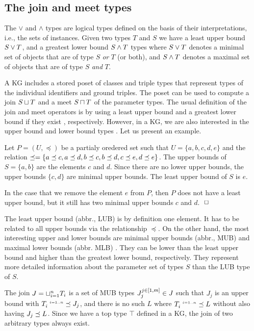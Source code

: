 \documentclass[runningheads]{llncs}
\newcommand{\s}{\scriptscriptstyle\ \,}
\newcommand{\finbox}{\phantom{.}\hfill\Box}
\begin{document}
\subsection{The join and meet types\label{sec:join-meet-types}}

The $\lor$ and $\land$ types are logical types defined on the basis of
their interpretations, i.e., the sets of instances. Given two types
$T$ and $S$ we have a least upper bound $S\lor\/T$, and a greatest
lower bound $S\land\/T$ types where $S\lor\/T$ denotes a minimal set
of objects that are of type $S$ \emph{or} $T$ (or both), and
$S\land\/T$ denotes a maximal set of objects that are of type $S$
\emph{and} $T$.

A KG includes a stored poset of classes and triple types that
represent types of the individual identifiers and ground triples. The
poset can be used to compute a join $S\sqcup\/T$ and a meet
$S\sqcap\/T$ of the parameter types. The usual definition of the join
and meet operators is by using a least upper bound and a greatest
lower bound if they exist \cite{Pierce2002}, respectively. However, in
a KG, we are also interested in the upper bound and lower bound types
\cite{DaveyPriestley2002}. Let us present an example.

\begin{example}
  Let $P=(U,\preceq)$ be a partialy oredered set such that
  $U=\{a,b,c,d,e\}$ and the relation
  $\preceq=\{a\preceq\/c,a\preceq\/d,b\preceq\/c,b\preceq\/d,c\preceq\/e,d\preceq\/e\}$.
  The upper bounds of $S=\{a,b\}$ are the elements $c$ and $d$. Since
  there are no lower upper bounds, the upper bounds $\{c,d\}$ are
  minimal upper bounds. The least upper bound of $S$ is $e$.

  In the case that we remove the element $e$ from $P$, then $P$ does
  not have a least upper bound, but it still has two minimal upper
  bounds $c$ and $d$. $\finbox$
\end{example}

The least upper bound (abbr., LUB) is by definition one element. It
has to be related to all upper bounds via the relationship
$\preceq$. On the other hand, the most interesting upper and lower
bounds are minimal upper bounds (abbr., MUB) and maximal lower bounds
(abbr. MLB) \cite{Knudstorp2024}. They can be lower than the least
upper bound and higher than the greatest lower bound,
respectively. They represent more detailed information about the
parameter set of types $S$ than the LUB type of $S$.

The join $J=\sqcup_{i=1}^n\/T_i$ is a set of MUB types
$J_j^{j\in[1,m]}\in\/J$ such that $J_j$ is an upper bound with
$T_i^{\s\/i=1..n}\preceq\/J_j$, and there is no such $L$ where
$T_i^{\s\/i=1..n}\preceq\/L$ without also having
$J_j\preceq\/L$. Since we have a top type $\top$ defined in a KG, the
join of two arbitrary types always exist.
\end{document}
